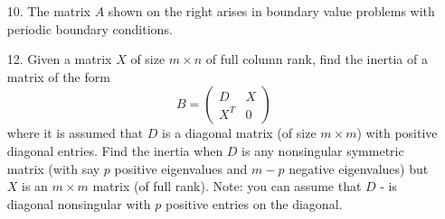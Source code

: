 \documentclass[11pt]{article}
\begin{document}
\begin{enumerate}
	\item[10.] The matrix \(A\) shown on the right arises in boundary value problems with periodic boundary conditions.

	\item[12.] Given a matrix \(X\) of size \(m \times n\) of full column rank, find the inertia of a matrix of the form
		\[B = \begin{pmatrix} D & X \\ X^T & 0 \end{pmatrix}\]
		where it is assumed that \(D\) is a diagonal matrix (of size \(m \times m\)) with positive diagonal entries.  Find the inertia when \(D\) is any nonsingular symmetric matrix (with say \(p\) positive eigenvalues and \(m-p\) negative eigenvalues) but \(X\) is an \(m \times m\) matrix (of full rank). Note: you can assume that \(D\) - is diagonal nonsingular with \(p\) positive entries on the diagonal.
\end{enumerate}
\end{document}
